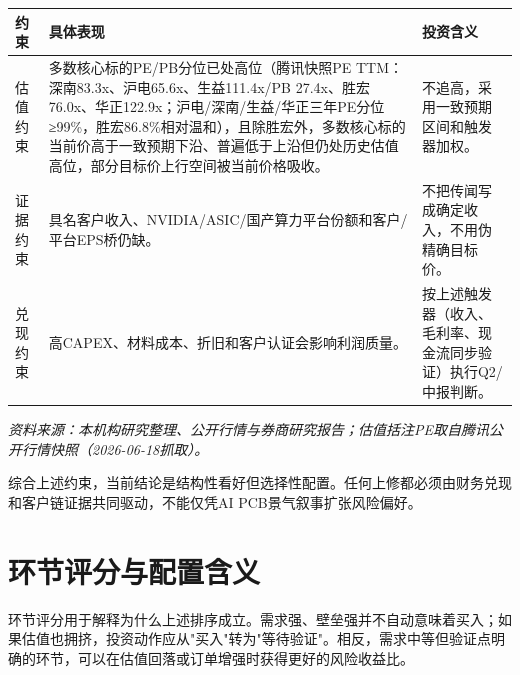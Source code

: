 \begin{exhibitbox}[图表1-3：不是全行业买入的三条约束]
\small
\begin{tabularx}{\textwidth}{L{2.6cm}X X}
\toprule
\textbf{约束} & \textbf{具体表现} & \textbf{投资含义} \\
\midrule
估值约束 & 多数核心标的PE/PB分位已处高位（腾讯快照PE TTM：深南83.3x、沪电65.6x、生益111.4x/PB 27.4x、胜宏76.0x、华正122.9x；沪电/深南/生益/华正三年PE分位≥99\%，胜宏86.8\%相对温和），且除胜宏外，多数核心标的当前价高于一致预期下沿、普遍低于上沿但仍处历史估值高位，部分目标价上行空间被当前价格吸收。 & 不追高，采用一致预期区间和触发器加权。 \\
证据约束 & 具名客户收入、NVIDIA/ASIC/国产算力平台份额和客户/平台EPS桥仍缺。 & 不把传闻写成确定收入，不用伪精确目标价。 \\
兑现约束 & 高CAPEX、材料成本、折旧和客户认证会影响利润质量。 & 按上述触发器（收入、毛利率、现金流同步验证）执行Q2/中报判断。 \\
\bottomrule
\end{tabularx}
\par{\scriptsize\color{mutedgrey}\textit{资料来源：本机构研究整理、公开行情与券商研究报告；估值括注PE取自腾讯公开行情快照（2026-06-18抓取）。}}
\end{exhibitbox}

综合上述约束，当前结论是结构性看好但选择性配置。任何上修都必须由财务兑现和客户链证据共同驱动，不能仅凭AI PCB景气叙事扩张风险偏好。

\section{环节评分与配置含义}

环节评分用于解释为什么上述排序成立。需求强、壁垒强并不自动意味着买入；如果估值也拥挤，投资动作应从"买入"转为"等待验证"。相反，需求中等但验证点明确的环节，可以在估值回落或订单增强时获得更好的风险收益比。

